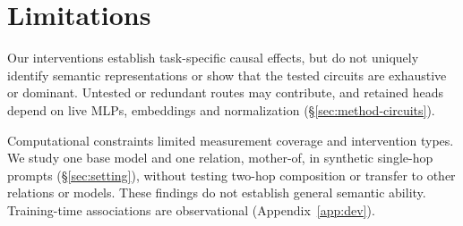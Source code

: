 \section*{Limitations}

Our interventions establish task-specific causal effects, but do not uniquely
identify semantic representations or show that the tested circuits are exhaustive
or dominant. Untested or redundant routes may contribute, and retained heads
depend on live MLPs, embeddings and normalization (\S\ref{sec:method-circuits}).

Computational constraints limited measurement coverage and intervention types.
We study one base model and one relation, mother-of, in synthetic single-hop
prompts (\S\ref{sec:setting}), without testing two-hop composition or transfer
to other relations or models. These findings do not establish general semantic
ability. Training-time associations are observational (Appendix~\ref{app:dev}).

